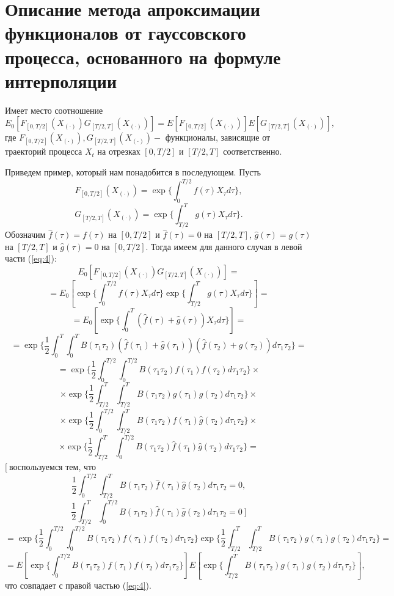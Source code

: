 \documentclass [12pt]{report}
\begin{document}
\pagebreak

\chapter{Описание метода апроксимации функционалов от гауссовского процесса, основанного на формуле интерполяции}

Имеет место соотношение
\begin{equation}
E_0[F_{[0,T/2]}(X_{(\cdot)})G_{[T/2,T]}(X_{(\cdot)})]=
E[F_{[0,T/2]}(X_{(\cdot)})]E[G_{[T/2,T]}(X_{(\cdot)})],
\label{eq:4}
\end{equation}
где $F_{[0,T/2]}(X_{(\cdot)}), G_{[T/2,T]}(X_{(\cdot)}) - $
функционалы, зависящие от траекторий процесса $X_t$ на
отрезках $[0,T/2]$ и $[T/2, T]$ соответственно.

Приведем пример, который нам понадобится в последующем. Пусть
$$
F_{[0,T/2]}(X_{(\cdot)}) = \exp\{\int_{0}^{T/2}f(\tau)X_{\tau}d\tau\},
$$
$$
G_{[T/2,T]}(X_{(\cdot)}) = \exp\{\int_{T/2}^{T}g(\tau)X_{\tau}d\tau\}.
$$
Обозначим $\hat{f}(\tau)=f(\tau)$ на $[0, T/2]$
и $\hat{f}(\tau)=0$ на $[T/2, T]$,
$\hat{g}(\tau)=g(\tau)$ на $[T/2, T]$
и $\hat{g}(\tau)=0$ на $[0, T/2]$.
Тогда имеем для данного случая в левой части (\ref{eq:4}):
$$
E_0[F_{[0,T/2]}(X_{(\cdot)})G_{[T/2,T]}(X_{(\cdot)})]=
$$
$$
=E_0[\exp\{\int_{0}^{T/2} f(\tau)X_{\tau}d\tau\}
\exp\{\int_{T/2}^{T} g(\tau)X_{\tau}d\tau\}]=
$$
$$
=E_0[\exp\{\int_{0}^{T}(\hat{f}(\tau)+\hat{g}(\tau))X_{\tau}d\tau\}]=
$$
$$
=\exp\{\frac{1}{2}\int_{0}^{T}\int_{0}^{T}B(\tau_1\tau_2)
(\hat{f}(\tau_1)+\hat{g}(\tau_1))(\hat{f}(\tau_2)+\hat{g}(\tau_2))
d\tau_1\tau_2\}=
$$
$$
= \exp\{\frac{1}{2}\int_{0}^{T/2}\int_{0}^{T/2}B(\tau_1\tau_2)
f(\tau_1)f(\tau_2)d\tau_1\tau_2\} \times
$$
$$
\times \exp\{\frac{1}{2}\int_{T/2}^{T}\int_{T/2}^{T}B(\tau_1\tau_2)
g(\tau_1)g(\tau_2)d\tau_1\tau_2\} \times
$$
$$
\times \exp\{\frac{1}{2}\int_{0}^{T/2}\int_{T/2}^{T}B(\tau_1\tau_2)
\hat{f}(\tau_1)\hat{g}(\tau_2)d\tau_1\tau_2\} \times
$$
$$
\times \exp\{\frac{1}{2}\int_{T/2}^{T}\int_{0}^{T/2}B(\tau_1\tau_2)
\hat{f}(\tau_1)\hat{g}(\tau_2)d\tau_1\tau_2\} =
$$
$\big[~$воспользуемся тем, что
$$
\frac{1}{2}\int_{0}^{T/2}\int_{T/2}^{T}B(\tau_1\tau_2)
\hat{f}(\tau_1)\hat{g}(\tau_2)d\tau_1\tau_2 = 0,
$$
$$
\frac{1}{2}\int_{T/2}^{T}\int_{0}^{T/2}B(\tau_1\tau_2)
\hat{f}(\tau_1)\hat{g}(\tau_2)d\tau_1\tau_2 = 0 ~\big]
$$
$$
= \exp\{\frac{1}{2}\int_{0}^{T/2}\int_{0}^{T/2}B(\tau_1\tau_2)
f(\tau_1)f(\tau_2)d\tau_1\tau_2\}
\exp\{\frac{1}{2}\int_{T/2}^{T}\int_{T/2}^{T}B(\tau_1\tau_2)
g(\tau_1)g(\tau_2)d\tau_1\tau_2\} =
$$
$$
= E[\exp\{\int_{0}^{T/2}B(\tau_1\tau_2)
f(\tau_1)f(\tau_2)d\tau_1\tau_2\}]
E[\exp\{\int_{T/2}^{T}B(\tau_1\tau_2)
g(\tau_1)g(\tau_2)d\tau_1\tau_2\}],
$$
что совпадает с правой частью (\ref{eq:4}).
\end{document}
